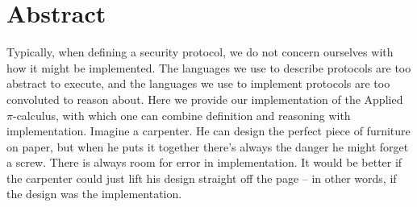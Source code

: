 \section*{Abstract}

Typically, when defining a security protocol, we do not concern ourselves with how it might be implemented. The languages we use to describe protocols are too abstract to execute, and the languages we use to implement protocols are too convoluted to reason about.
Here we provide our implementation of the Applied $\pi$-calculus, with which one can combine definition and reasoning with implementation. 
Imagine a carpenter. He can design the perfect piece of furniture on paper, but when he puts it together there's always the danger he might forget a screw. There is always room for error in implementation. It would be better if the carpenter could just lift his design straight off the page -- in other words, if the design was the implementation.
